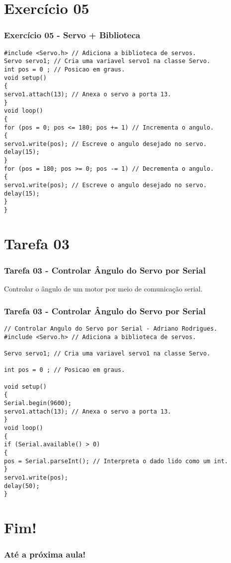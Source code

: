 \documentclass{beamer}
\begin{document}
\section{Exercício 05}
\begin{frame}[fragile]
	\frametitle{Exercício 05 - Servo + Biblioteca}
	\begin{lstlisting}[style=Arduino,basicstyle=\scriptsize \ttfamily]
#include <Servo.h> // Adiciona a biblioteca de servos.
Servo servo1; // Cria uma variavel servo1 na classe Servo.
int pos = 0 ; // Posicao em graus.
void setup()
{
servo1.attach(13); // Anexa o servo a porta 13.
}
void loop()
{
for (pos = 0; pos <= 180; pos += 1) // Incrementa o angulo.
{
servo1.write(pos); // Escreve o angulo desejado no servo.
delay(15);
}
for (pos = 180; pos >= 0; pos -= 1) // Decrementa o angulo.
{
servo1.write(pos); // Escreve o angulo desejado no servo.
delay(15);
}
}	\end{lstlisting}
\end{frame}

\section{Tarefa 03}
\begin{frame}
	\frametitle{Tarefa 03 - Controlar Ângulo do Servo por Serial}
	Controlar o ângulo de um motor por meio de comunicação serial.
\end{frame}

\begin{frame}[fragile]
	\frametitle{Tarefa 03 - Controlar Ângulo do Servo por Serial}
	\begin{lstlisting}[style=Arduino,basicstyle=\scriptsize \ttfamily]
// Controlar Angulo do Servo por Serial - Adriano Rodrigues.
#include <Servo.h> // Adiciona a biblioteca de servos.

Servo servo1; // Cria uma variavel servo1 na classe Servo.

int pos = 0 ; // Posicao em graus.

void setup()
{
Serial.begin(9600);
servo1.attach(13); // Anexa o servo a porta 13.
}
void loop()
{
if (Serial.available() > 0)
{
pos = Serial.parseInt(); // Interpreta o dado lido como um int.
}
servo1.write(pos);
delay(50);
}	\end{lstlisting}
\end{frame}

\section{Fim!}
\begin{frame}
	\frametitle{Até a próxima aula!}
	\titlepage
\end{frame}
	
\end{document}
